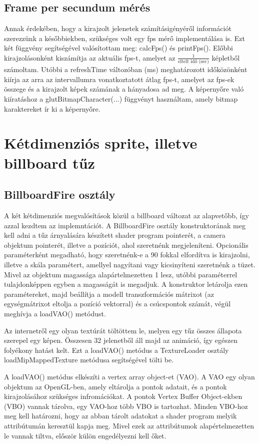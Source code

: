 \subsection{Frame per secundum mérés}
Annak érdekében, hogy a kirajzolt jelenetek számításigényéről információt szerezzünk a későbbiekben, szükséges volt egy fps mérő implementálása is. Ezt két függvény segítségével valósítottam meg: calcFps() és printFps(). Előbbi kirajzolásonként kiszámítja az aktuális fps-t, amelyet az $\frac{1}{\text{eltelt idő (sec)}}$ képletből számoltam. Utóbbi a refreshTime változóban (ms) meghatározott időközönként kiírja az arra az intervallumra vonatkoztatott átlag fps-t, amelyet az fps-ek összege és a kirajzolt képek számának a hányadosa ad meg. A képernyőre való kiíratáshoz a glutBitmapCharacter(...) függvényt használtam, amely bitmap karaktereket ír ki a képernyőre. 


\section{Kétdimenziós sprite, illetve billboard tűz}

\subsection{BillboardFire osztály}
A két kétdimenziós megvalósítások közül a billboard változat az alapvetőbb, így azzal kezdtem az implemntációt. A BillboardFire osztály konstruktorának meg kell adni a tűz árnyalására készített shader program pointerét, a camera objektum pointerét, illetve a pozíciót, ahol szeretnénk megjeleníteni. Opcionális paraméterként megadható, hogy szeretnénk-e a 90 fokkal elfordítva is kirajzolni, illetve a skála paramétert, amellyel nagyítani vagy kicsinyíteni szeretnénk a tüzet. Mivel az objektum magassága alapártelmezetten 1 lesz, utóbbi paraméterrel tulajdonképpen egyben a magasságát is megadjuk. A konstruktor letárolja ezen paramétereket, majd beállítja a modell transzformációs mátrixot (az egységmátrixot eltolja a pozíció vektorral) és a csúcspontok számát, végül meghívja a loadVAO() metódust.

Az internetről egy olyan textúrát töltöttem le, melyen egy tűz összes állapota szerepel egy képen. Összesen 32 jelenetből áll majd az animáció, így egészen folyékony hatást kelt. Ezt a loadVAO() metódus a TextureLoader osztály loadMipMappedTexture metódusa segítségével tölti be. 

A loadVAO() metódus elkészíti a vertex array object-et (VAO). A VAO egy olyan objektum az OpenGL-ben, amely eltárolja a pontok adatait, és a pontok kirajzolásához szükséges infromációkat. A pontok Vertex Buffer Object-ekben (VBO) vannak tárolva, egy VAO-hoz több VBO is tartozhat. Minden VBO-hoz meg kell határozni, hogy az abban tárolt adatokat a shader program melyik attribútumán keresztül kapja meg. Mivel ezek az attribútumok alapértelmezetten le vannak tiltva, először külön engedélyezni kell őket. 

